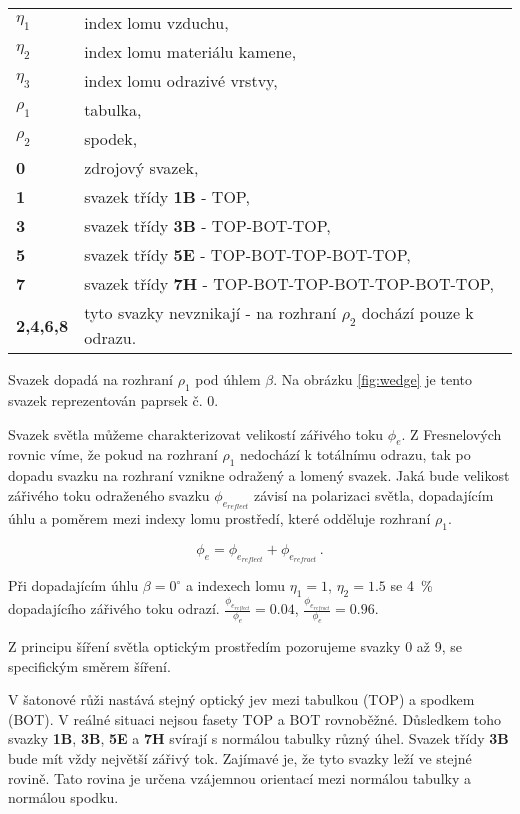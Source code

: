 \begin{tabular}{p{2cm} l}
$\eta_1$ & index lomu vzduchu,\\
$\eta_2$ & index lomu materiálu kamene,\\
$\eta_3$ & index lomu odrazivé vrstvy,\\
$\rho_1$ & tabulka,\\
$\rho_2$ & spodek,\\
\textbf{0} & zdrojový svazek,\\
\textbf{1} & svazek třídy \textbf{1B} - TOP,\\
\textbf{3} & svazek třídy \textbf{3B} - TOP-BOT-TOP,\\
\textbf{5} & svazek třídy \textbf{5E} - TOP-BOT-TOP-BOT-TOP,\\
\textbf{7} & svazek třídy \textbf{7H} - TOP-BOT-TOP-BOT-TOP-BOT-TOP,\\
\textbf{2,4,6,8} & tyto svazky nevznikají - na rozhraní $\rho_2$ dochází pouze k odrazu.\\
\end{tabular}
\vspace{2mm}

Svazek dopadá na rozhraní $\rho_1$ pod úhlem $\beta$. Na obrázku \ref{fig:wedge} je tento svazek reprezentován paprsek č. 0. 

Svazek světla můžeme charakterizovat velikostí zářivého toku $\phi_e$. Z Fresnelových rovnic \cite{Handbook} víme, že pokud na rozhraní $\rho_1$ nedochází k totálnímu odrazu, tak po dopadu svazku na rozhraní vznikne odražený a lomený svazek. Jaká bude velikost zářivého toku odraženého svazku $\phi_{e_{reflect}}$ závisí na polarizaci světla, dopadajícím úhlu a poměrem mezi indexy lomu prostředí, které odděluje rozhraní $\rho_1$.

\begin{equation}
\phi_e = \phi_{e_{reflect}} + \phi_{e_{refract}}\,.
\end{equation}

 Při dopadajícím úhlu $\beta = 0^\circ$ a indexech lomu $\eta_1 = 1$, $\eta_2 = 1.5$ se \SI{4}{\percent} dopadajícího zářivého toku odrazí. $\frac{\phi_{e_{reflect}}}{\phi_e} = 0.04$, $\frac{\phi_{e_{refract}}}{\phi_e} = 0.96$.

Z principu šíření světla optickým prostředím pozorujeme svazky 0 až 9, se specifickým směrem šíření. 

V šatonové růži nastává stejný optický jev mezi tabulkou (TOP) a spodkem (BOT). V reálné situaci nejsou fasety TOP a BOT rovnoběžné. Důsledkem toho svazky \textbf{1B}, \textbf{3B}, \textbf{5E} a \textbf{7H} svírají s normálou tabulky různý úhel. Svazek třídy \textbf{3B} bude mít vždy největší zářivý tok. Zajímavé je, že tyto svazky leží ve stejné rovině. Tato rovina je určena vzájemnou orientací mezi normálou tabulky a normálou spodku.


